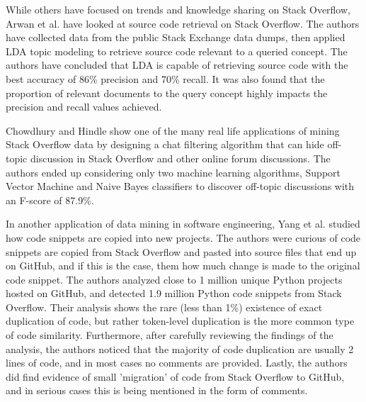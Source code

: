         While others have focused on trends and knowledge sharing on Stack Overflow, Arwan et al. \cite{arwan2015source} have looked at source code retrieval on Stack Overflow. The authors have collected data from the public Stack Exchange data dumps, then applied LDA topic modeling to retrieve source code relevant to a queried concept. The authors have concluded that LDA is capable of retrieving source code with the best accuracy of 86\% precision and 70\% recall. It was also found that the proportion of relevant documents to the query concept highly impacts the precision and recall values achieved.
        
        Chowdhury and Hindle \cite{chowdhury2015mining} show one of the many real life applications of mining Stack Overflow data by designing a chat filtering algorithm that can hide off-topic discussion in Stack Overflow and other online forum discussions. The authors ended up considering only two machine learning algorithms, Support Vector Machine and Naive Bayes classifiers to discover off-topic discussions with an F-score of 87.9\%.
        
        In another application of data mining in software engineering, Yang et al. \cite{yang2017stack} studied how code snippets are copied into new projects. The authors were curious of code snippets are copied from Stack Overflow and pasted into source files that end up on GitHub, and if this is the case, them how much change is made to the original code snippet. The authors analyzed close to 1 million unique Python projects hosted on GitHub, and detected 1.9 million Python code snippets from Stack Overflow. Their analysis shows the rare (less than 1\%) existence of exact duplication of code, but rather token-level duplication is the more common type of code similarity. Furthermore, after carefully reviewing the findings of the analysis, the authors noticed that the majority of code duplication are usually 2 lines of code, and in most cases no comments are provided. Lastly, the authors did find evidence of small 'migration' of code from Stack Overflow to GitHub, and in serious cases this is being mentioned in the form of comments.
        
